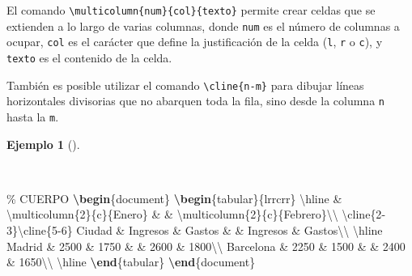 \documentclass[
  a4paper,
]{scrreport}
\newenvironment{Shaded}{\begin{snugshade}}{\end{snugshade}}
\newcommand{\CommentTok}[1]{\textcolor[rgb]{0.37,0.37,0.37}{#1}}
\newcommand{\ExtensionTok}[1]{\textcolor[rgb]{0.00,0.23,0.31}{#1}}
\newcommand{\FunctionTok}[1]{\textcolor[rgb]{0.28,0.35,0.67}{#1}}
\newcommand{\KeywordTok}[1]{\textcolor[rgb]{0.00,0.23,0.31}{\textbf{#1}}}
\newcommand{\NormalTok}[1]{\textcolor[rgb]{0.00,0.23,0.31}{#1}}
\newcommand{\OperatorTok}[1]{\textcolor[rgb]{0.37,0.37,0.37}{#1}}
\theoremstyle{definition}
\newtheorem{example}{Ejemplo}[chapter]
\theoremstyle{remark}
\begin{document}
El comando \texttt{\textbackslash{}multicolumn\{num\}\{col\}\{texto\}}
permite crear celdas que se extienden a lo largo de varias columnas,
donde \texttt{num} es el número de columnas a ocupar, \texttt{col} es el
carácter que define la justificación de la celda (\texttt{l}, \texttt{r}
o \texttt{c}), y \texttt{texto} es el contenido de la celda.

También es posible utilizar el comando
\texttt{\textbackslash{}cline\{n-m\}} para dibujar líneas horizontales
divisorias que no abarquen toda la fila, sino desde la columna
\texttt{n} hasta la \texttt{m}.

\begin{example}[]\protect\hypertarget{exm-tabla-multicolumna}{}\label{exm-tabla-multicolumna}

~

\begin{Shaded}
\begin{Highlighting}[]
\CommentTok{\% CUERPO}
\KeywordTok{\textbackslash{}begin}\NormalTok{\{}\ExtensionTok{document}\NormalTok{\}}
\KeywordTok{\textbackslash{}begin}\NormalTok{\{}\ExtensionTok{tabular}\NormalTok{\}\{lrrcrr\}}
\FunctionTok{\textbackslash{}hline}
 \OperatorTok{\&} \FunctionTok{\textbackslash{}multicolumn}\NormalTok{\{2\}\{c\}\{Enero\} }\OperatorTok{\&} \OperatorTok{\&} \FunctionTok{\textbackslash{}multicolumn}\NormalTok{\{2\}\{c\}\{Febrero\}}\FunctionTok{\textbackslash{}\textbackslash{}}
\FunctionTok{\textbackslash{}cline}\NormalTok{\{2{-}3\}}\FunctionTok{\textbackslash{}cline}\NormalTok{\{5{-}6\}}
\NormalTok{Ciudad }\OperatorTok{\&}\NormalTok{ Ingresos }\OperatorTok{\&}\NormalTok{ Gastos }\OperatorTok{\&} \OperatorTok{\&}\NormalTok{ Ingresos }\OperatorTok{\&}\NormalTok{ Gastos}\FunctionTok{\textbackslash{}\textbackslash{}} 
\FunctionTok{\textbackslash{}hline}
\NormalTok{Madrid }\OperatorTok{\&}\NormalTok{ 2500 }\OperatorTok{\&}\NormalTok{ 1750 }\OperatorTok{\&} \OperatorTok{\&}\NormalTok{ 2600 }\OperatorTok{\&}\NormalTok{ 1800}\FunctionTok{\textbackslash{}\textbackslash{}} 
\NormalTok{Barcelona }\OperatorTok{\&}\NormalTok{ 2250 }\OperatorTok{\&}\NormalTok{ 1500 }\OperatorTok{\&} \OperatorTok{\&}\NormalTok{ 2400 }\OperatorTok{\&}\NormalTok{ 1650}\FunctionTok{\textbackslash{}\textbackslash{}} 
\FunctionTok{\textbackslash{}hline}
\KeywordTok{\textbackslash{}end}\NormalTok{\{}\ExtensionTok{tabular}\NormalTok{\}}
\KeywordTok{\textbackslash{}end}\NormalTok{\{}\ExtensionTok{document}\NormalTok{\}}
\end{Highlighting}
\end{Shaded}


\end{example}
\end{document}
